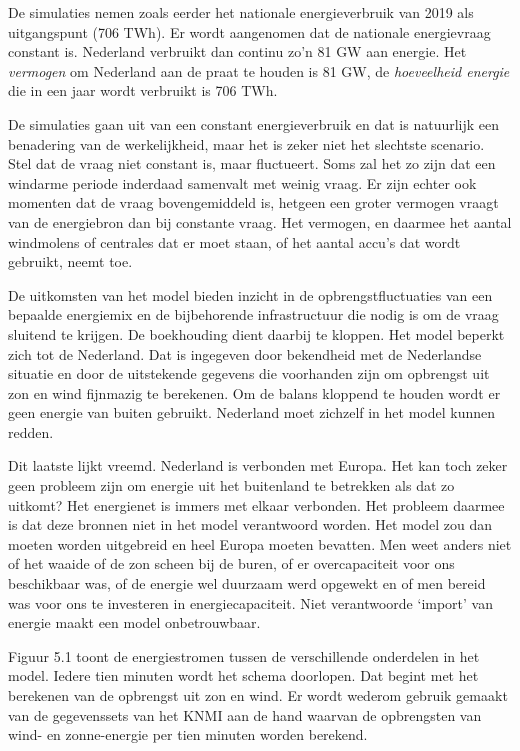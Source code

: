 \documentclass[
  11pt,
  a4paper,
]{book}
\begin{document}
De simulaties nemen zoals eerder het nationale energieverbruik van 2019 als uitgangspunt (706 TWh). Er wordt aangenomen dat de nationale energievraag constant is. Nederland verbruikt dan continu zo'n 81 GW aan energie. Het \emph{vermogen} om Nederland aan de praat te houden is 81 GW, de \emph{hoeveelheid energie} die in een jaar wordt verbruikt is 706 TWh.

De simulaties gaan uit van een constant energieverbruik en dat is natuurlijk een benadering van de werkelijkheid, maar het is zeker niet het slechtste scenario. Stel dat de vraag niet constant is, maar fluctueert. Soms zal het zo zijn dat een windarme periode inderdaad samenvalt met weinig vraag. Er zijn echter ook momenten dat de vraag bovengemiddeld is, hetgeen een groter vermogen vraagt van de energiebron dan bij constante vraag. Het vermogen, en daarmee het aantal windmolens of centrales dat er moet staan, of het aantal accu's dat wordt gebruikt, neemt toe.

De uitkomsten van het model bieden inzicht in de opbrengstfluctuaties van een bepaalde energiemix en de bijbehorende infrastructuur die nodig is om de vraag sluitend te krijgen. De boekhouding dient daarbij te kloppen. Het model beperkt zich tot de Nederland. Dat is ingegeven door bekendheid met de Nederlandse situatie en door de uitstekende gegevens die voorhanden zijn om opbrengst uit zon en wind fijnmazig te berekenen. Om de balans kloppend te houden wordt er geen energie van buiten gebruikt. Nederland moet zichzelf in het model kunnen redden.

Dit laatste lijkt vreemd. Nederland is verbonden met Europa. Het kan toch zeker geen probleem zijn om energie uit het buitenland te betrekken als dat zo uitkomt? Het energienet is immers met elkaar verbonden. Het probleem daarmee is dat deze bronnen niet in het model verantwoord worden. Het model zou dan moeten worden uitgebreid en heel Europa moeten bevatten. Men weet anders niet of het waaide of de zon scheen bij de buren, of er overcapaciteit voor ons beschikbaar was, of de energie wel duurzaam werd opgewekt en of men bereid was voor ons te investeren in energiecapaciteit. Niet verantwoorde `import' van energie maakt een model onbetrouwbaar.

\bigskip\noindent
Figuur 5.1 toont de energiestromen tussen de verschillende onderdelen in het model. Iedere tien minuten wordt het schema doorlopen. Dat begint met het berekenen van de opbrengst uit zon en wind. Er wordt wederom gebruik gemaakt van de gegevenssets van het KNMI aan de hand waarvan de opbrengsten van wind- en zonne-energie per tien minuten worden berekend.
\end{document}
